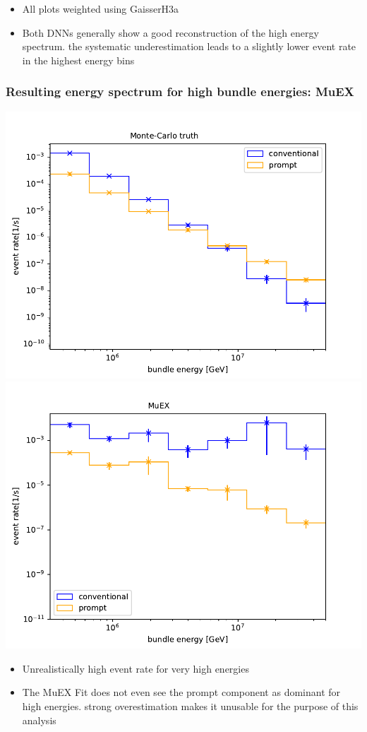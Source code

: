 \documentclass[aspectratio=1610, 9pt]{beamer}
\begin{document}
\begin{frame}
  \begin{itemize}
    \item All plots weighted using GaisserH3a
    \item Both DNNs generally show a good reconstruction of the high energy spectrum. the systematic underestimation leads to a slightly lower event rate in the highest energy bins
  \end{itemize}
\end{frame}
\begin{frame}
  \frametitle{Resulting energy spectrum for high bundle energies: MuEX}
  \includegraphics[scale=0.45]{Plots/spectrum_MC_bundle.pdf}
  \includegraphics[scale=0.45]{Plots/spectrum_muex_bundle.pdf}
  \begin{itemize}
    \item Unrealistically high event rate for very high energies
    \item The MuEX Fit does not even see the prompt component as dominant for high energies. \rightarrow strong overestimation makes it unusable for the purpose of this analysis
  \end{itemize}
\end{frame}
\end{document}
